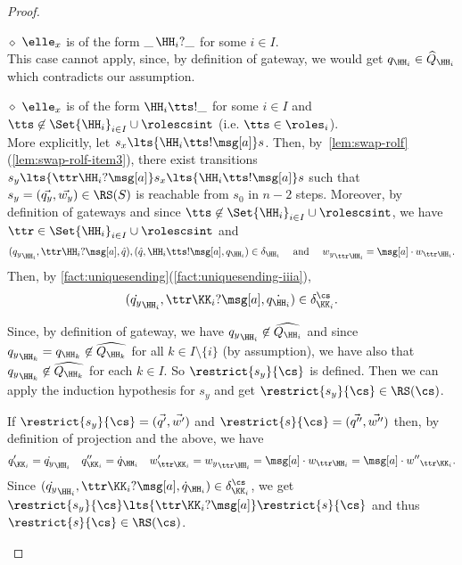 \begin{proof}
\begin{description}
\underline{$\diamond$}
$\elle_x$ is of the form $\_\,\HH_i?\_$  for some $i\in I$.  \\
This case cannot apply, since, by definition of gateway, we would get 
$q_{\HH_i}\in \widehat Q_{\HH_i}$ which contradicts our assumption.

\item

\underline{$\diamond$}
$\elle_x$ is of the form $\HH_i\tts!\_$ for some $i\in I$ and $\tts\not\in\Set{\HH_i}_{i\in I}\cup\rolescsint$ (i.e. $\tts\in\roles_i$).\\
More explicitly, let $s_x\lts{\HH_i\tts!\msg[a]}s$. 
Then, by~\cref{lem:swap-rolf}(\ref{lem:swap-rolf-item3}), there exist
transitions
$s_y \lts{\ttr\HH_i?\msg[a]}s_x\lts{\HH_i\tts!\msg[a]}s$
such that $s_y = (\vec{q_y},\vec{w_y})\in \RS(S)$ is reachable from $s_0$ in $n-2$ steps.
Moreover, by definition of gateways and since $\tts\not\in\Set{\HH_i}_{i\in I}\cup\rolescsint$, we have $\ttr \in\Set{\HH_i}_{i\in I}\cup\rolescsint$ and %
$$({q_y}_{\HH_i},\ttr\HH_i?\msg[a],\hat q),
    (\hat q, \HH_i\tts!\msg[a], {q}_{\HH_i})\in\delta_{\HH_i}
\quad\text{ and }\quad {w_y}_{\ttr\HH_i} = \msg[a]\cdot {w}_{\ttr\HH_i}.$$
Then,  by  \cref{fact:uniquesending}(\ref{fact:uniquesending-iiia}),  %
$$(\dot{q_y}_{\HH_i},\ttr\KK_i?\msg[a],\dot{q_{\HH_i}})\in \delta^\cs_{\KK_i}.$$

Since, by definition of gateway, we have
${q_y}_{\HH_i}\not\in\widehat{Q_{\HH_i}}$ and since
${q_y}_{\HH_k} = q_{\HH_k}\not\in\widehat{Q_{\HH_k}}$
for all $k\in I\setminus\{i\}$ (by assumption),
we have also that ${q_y}_{\HH_k}\not\in\widehat{Q_{\HH_k}}$ for each $k\in I$. 
 So $\restrict{s_y}{\cs}$ is defined.
Then we can apply the induction hypothesis for $s_y$ and get 
$\restrict{s_y}{\cs}\in \RS(\cs)$. 

If $\restrict{s_y}{\cs} = (\vec{q'},\vec{w'})$
and $\restrict{s}{\cs} = (\vec{q''},\vec{w''})$ then,
 by definition of projection and the above, we have 
$$q'_{\KK_i} = \dot{{{q}}_y}_{\HH_i} \quad
q''_{\KK_i} = \dot{{{q}}}_{\HH_i} \quad
w'_{\ttr\KK_i} = {w_y}_{\ttr\HH_i} = \msg[a]\cdot {w}_{\ttr\HH_i} = \msg[a]\cdot {w''}_{\ttr\KK_i}.$$
Since $(\dot{q_y}_{\HH_i},\ttr\KK_i?\msg[a],\dot{q}_{\HH_i})\in \delta^\cs_{\KK_i}$, we get $\restrict{s_y}{\cs}\lts{\ttr\KK_i?\msg[a]}\restrict{s}{\cs}$ and thus $\restrict{s}{\cs}\in \RS(\cs)$.
%
\item


\end{description}
\end{proof}

